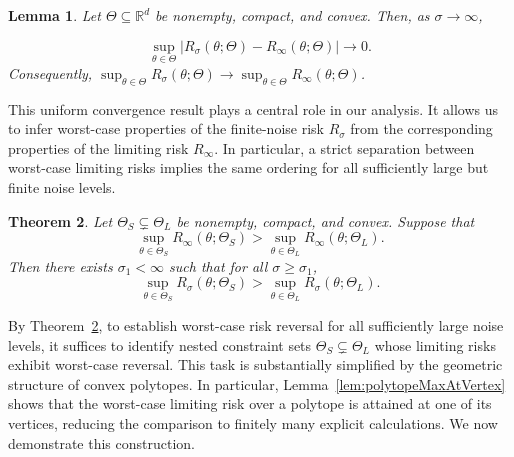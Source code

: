 \documentclass[11pt]{article}
\theoremstyle{plain}
\newtheorem{theorem}{Theorem}[section]
\newtheorem{lemma}[theorem]{Lemma}
\theoremstyle{definition}
\providecommand{\mathbbm}{\mathbb} %
\newcommand{\R}{\mathbbm{R}}
\begin{document}
\begin{lemma}\label{lem:uniform-large-sigma}
Let $\Theta\subseteq\R^d$ be nonempty, compact, and convex. Then, as
$\sigma\to\infty$,

\[
\sup_{\theta\in\Theta}
\left|
R_\sigma(\theta;\Theta)-R_\infty(\theta;\Theta)
\right|
\to 0.
\]
Consequently, $\sup_{\theta\in\Theta}R_\sigma(\theta;\Theta)
\to \sup_{\theta\in\Theta}R_\infty(\theta;\Theta)$.
\end{lemma}

This uniform convergence result plays a central role in our analysis. It allows us to infer worst-case properties of the finite-noise risk $R_\sigma$ from the corresponding properties of the limiting risk $R_\infty$. In particular, a strict separation between worst-case limiting risks implies the same ordering for all sufficiently large but finite noise levels.

\begin{theorem}\label{thm:finite-sigma-reversal}
Let $\Theta_S \subsetneq \Theta_L$ be nonempty, compact, and convex.
Suppose that
\[
\sup_{\theta\in\Theta_S} R_\infty(\theta; \Theta_S)
>
\sup_{\theta\in\Theta_L} R_\infty(\theta; \Theta_L).
\]
Then there exists $\sigma_1<\infty$ such that for all $\sigma\ge\sigma_1$,
\[
\sup_{\theta\in\Theta_S} R_\sigma(\theta;\Theta_S)
>
\sup_{\theta\in\Theta_L} R_\sigma(\theta;\Theta_L).
\]
\end{theorem}

By Theorem~\ref{thm:finite-sigma-reversal}, to establish worst-case risk reversal for all sufficiently large noise levels, it suffices to identify nested constraint sets $\Theta_S\subsetneq \Theta_L$ whose limiting risks exhibit worst-case reversal. This task is substantially simplified by the geometric structure of convex polytopes.
In particular, Lemma~\ref{lem:polytopeMaxAtVertex} shows that the worst-case limiting risk over a polytope is attained at one of its vertices, reducing the comparison to finitely many explicit calculations. We now demonstrate this construction.
\end{document}
